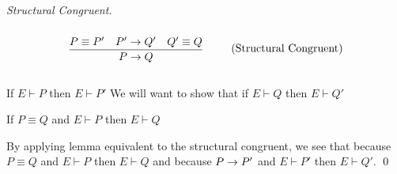 \begin{theorem}
    \begin{proof}[Structural Congruent]
        \begin{align*}
            \infrule{P \equiv P' \quad P' \ra Q' \quad Q' \equiv Q}{P \ra Q} \tag{Structural Congruent}
        \end{align*}

        If \ensuremath{E \vdash P} then \ensuremath{E \vdash P'} We will want to show that if \ensuremath{E \vdash Q} then \ensuremath{E \vdash Q'}

        \begin{lemma}[Equivalent]
            If \ensuremath{P \equiv Q} and \ensuremath{E \vdash P} then \ensuremath{E \vdash Q}
        \end{lemma}

        By applying lemma equivalent to the structural congruent, we see that because \ensuremath{P \equiv Q} and \ensuremath{E \vdash P} then \ensuremath{E \vdash Q} and because \ensuremath{P \ra P'} and \ensuremath{E \vdash P'} then \ensuremath{E \vdash Q'}.
        \qed
    \end{proof}
\end{theorem}
\newpage

